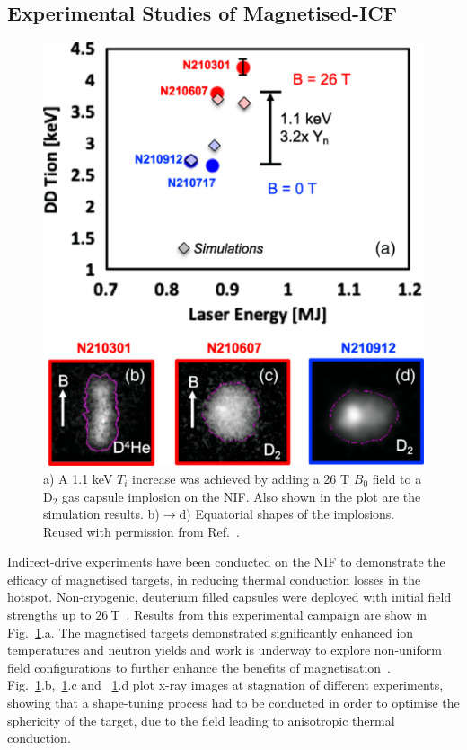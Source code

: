 \subsection{Experimental Studies of Magnetised-ICF}%
\label{sec:Res2_magicf_prevwork}

\begin{figure}[t!]
    \includegraphics[width=0.5\linewidth]{Results2/Images/magnif_yield_inc.png}
    \centering
    \caption{a) A 1.1 keV $T_i$ increase was achieved by adding a 26 T $B_0$ field to a D${}_{2}$ gas capsule implosion on the \ac{NIF}.
    Also shown in the plot are the simulation results.
    b)$\rightarrow$d) Equatorial shapes of the implosions.
    Reused with permission from Ref.~\cite{moody_increased_2022}.}%
    \label{fig:Res2_moody_magnif}
\end{figure}

Indirect-drive experiments have been conducted on the \ac{NIF} to demonstrate the efficacy of magnetised targets, in reducing thermal conduction losses in the hotspot.
Non-cryogenic, deuterium filled capsules were deployed with initial field strengths up to $26\ \text{T}$~\cite{moody_increased_2022}.
Results from this experimental campaign are show in Fig.~\ref{fig:Res2_moody_magnif}.a.
The magnetised targets demonstrated significantly enhanced ion temperatures and neutron yields and work is underway to explore non-uniform field configurations to further enhance the benefits of magnetisation~\cite{walsh_application_2023}.
Fig.~\ref{fig:Res2_moody_magnif}.b,~\ref{fig:Res2_moody_magnif}.c and ~\ref{fig:Res2_moody_magnif}.d plot x-ray images at stagnation of different experiments, showing that a shape-tuning process had to be conducted in order to optimise the sphericity of the target, due to the field leading to anisotropic thermal conduction.

